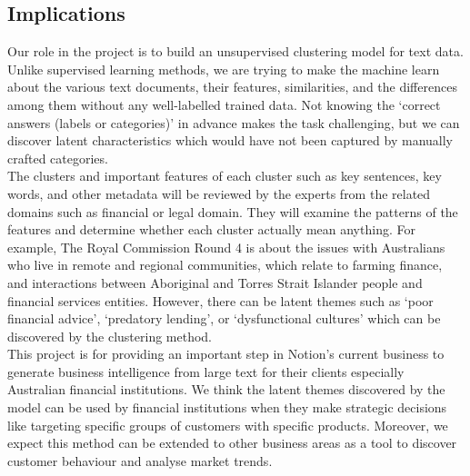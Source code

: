 \documentclass[12pt]{article}
\begin{document}
\subsection{Implications}
Our role in the project is to build an unsupervised clustering model for text data. Unlike   supervised learning methods, we are trying to make the machine learn about the various text documents, their features, similarities, and the differences among them without any well-labelled trained data. Not knowing the ‘correct answers (labels or categories)’ in advance makes the task challenging, but we can discover latent characteristics which would have not been captured by manually crafted categories.\\
 
The clusters and important features of each cluster such as key sentences, key words, and other metadata will be reviewed by the experts from the related domains such as financial or legal domain. They will examine the patterns of the features and determine whether each cluster actually mean anything. For example, The Royal Commission Round 4 is about the issues with Australians who live in remote and regional communities, which relate to farming finance, and interactions between Aboriginal and Torres Strait Islander people and financial services entities. However, there can be latent themes such as ‘poor financial advice’, ‘predatory lending’, or ‘dysfunctional cultures’ which can be discovered by the clustering method. \\

This project is for providing an important step in Notion’s current business to generate business intelligence from large text for their clients especially Australian financial institutions. We think the latent themes discovered by the model can be used by financial institutions when they make strategic decisions like targeting specific groups of customers with specific products. Moreover, we expect this method can be extended to other business areas as a tool to discover customer behaviour and analyse market trends. \\
\end{document}

